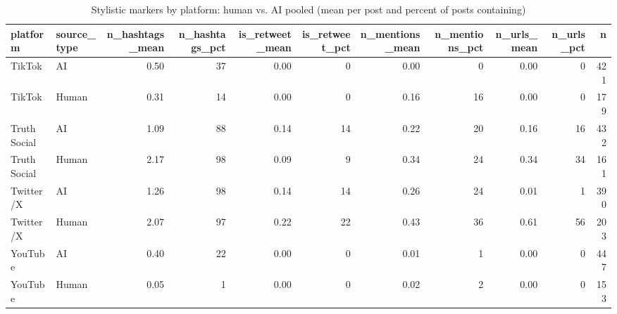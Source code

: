 \begin{table}

\caption{Stylistic markers by platform: human vs. AI pooled (mean per post and percent of posts containing)}
\centering
\begin{tabular}[t]{llrrrrrrrrr}
\toprule
platform & source\_type & n\_hashtags\_mean & n\_hashtags\_pct & is\_retweet\_mean & is\_retweet\_pct & n\_mentions\_mean & n\_mentions\_pct & n\_urls\_mean & n\_urls\_pct & n\\
\midrule
TikTok & AI & 0.50 & 37 & 0.00 & 0 & 0.00 & 0 & 0.00 & 0 & 421\\
TikTok & Human & 0.31 & 14 & 0.00 & 0 & 0.16 & 16 & 0.00 & 0 & 179\\
Truth Social & AI & 1.09 & 88 & 0.14 & 14 & 0.22 & 20 & 0.16 & 16 & 432\\
Truth Social & Human & 2.17 & 98 & 0.09 & 9 & 0.34 & 24 & 0.34 & 34 & 161\\
Twitter/X & AI & 1.26 & 98 & 0.14 & 14 & 0.26 & 24 & 0.01 & 1 & 390\\
\addlinespace
Twitter/X & Human & 2.07 & 97 & 0.22 & 22 & 0.43 & 36 & 0.61 & 56 & 203\\
YouTube & AI & 0.40 & 22 & 0.00 & 0 & 0.01 & 1 & 0.00 & 0 & 447\\
YouTube & Human & 0.05 & 1 & 0.00 & 0 & 0.02 & 2 & 0.00 & 0 & 153\\
\bottomrule
\end{tabular}
\end{table}
